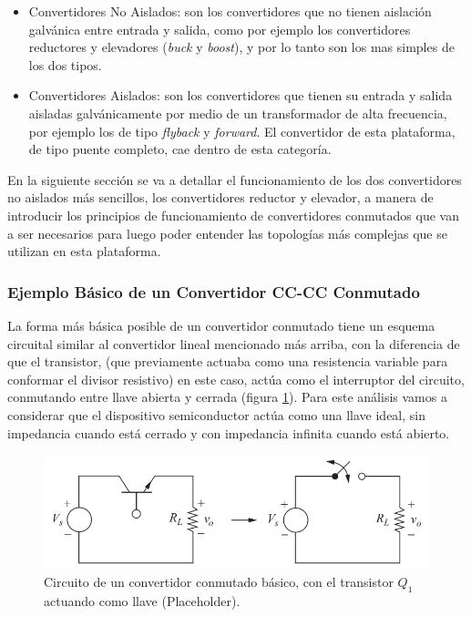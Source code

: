 \begin{itemize}
    \item {\SemiBold Convertidores No Aislados:} son los convertidores que no tienen aislación galvánica entre entrada y salida, como por ejemplo los convertidores reductores y elevadores (\textit{buck} y \textit{boost}), y por lo tanto son los mas simples de los dos tipos.
    \item {\SemiBold Convertidores Aislados:} son los convertidores que tienen su entrada y salida aisladas galvánicamente por medio de un transformador de alta frecuencia, por ejemplo los de tipo \textit{flyback} y \textit{forward}. El convertidor de esta plataforma, de tipo puente completo, cae dentro de esta categoría.
\end{itemize}

En la siguiente sección se va a detallar el funcionamiento de los dos convertidores no aislados más sencillos, los convertidores reductor y elevador, a manera de introducir los principios de funcionamiento de convertidores conmutados que van a ser necesarios para luego poder entender las topologías más complejas que se utilizan en esta plataforma.\\

\subsubsection{Ejemplo Básico de un Convertidor CC-CC Conmutado}

La forma más básica posible de un convertidor conmutado tiene un esquema circuital similar al convertidor lineal mencionado más arriba, con la diferencia de que el transistor, (que previamente actuaba como una resistencia variable para conformar el divisor resistivo) en este caso, actúa como el interruptor del circuito, conmutando entre llave abierta y cerrada (figura \ref{proto_reductor}). Para este análisis vamos a considerar que el dispositivo semiconductor actúa como una llave ideal, sin impedancia cuando está cerrado y con impedancia infinita cuando está abierto.

\begin{figure}[H]
    \centering
    \includegraphics[scale=0.4]{Imagenes/Proto Reductor.png}
    \caption{Circuito de un convertidor conmutado básico, con el transistor $Q_1$ actuando como llave (Placeholder).}
    \label{proto_reductor}
\end{figure}

